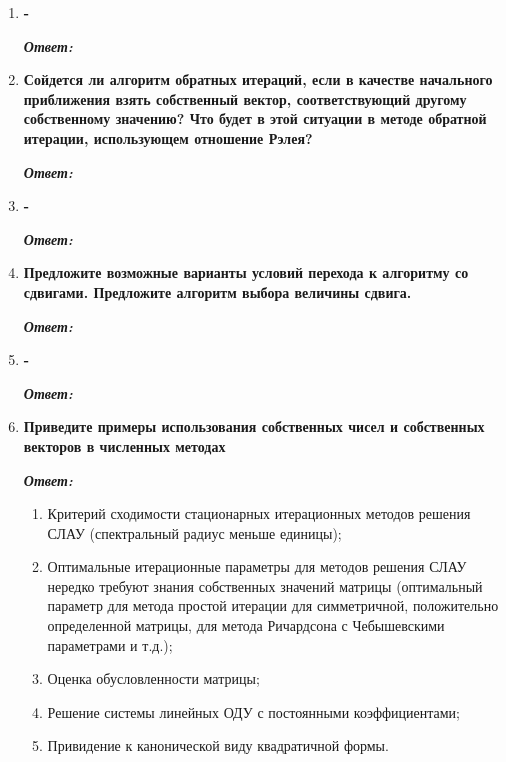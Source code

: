 \documentclass[12pt, a4paper]{article}
\begin{document}
\begin{enumerate}
	
	\item \textbf{-}
	\vspace*{0.2cm}
	
	\textit{\textbf{Ответ:}}
	
	\item \textbf{Сойдется ли алгоритм обратных итераций, если в качестве начального приближения взять собственный вектор, соответствующий другому собственному значению? Что будет в этой ситуации в методе обратной итерации, использующем отношение Рэлея?}
	
	\vspace*{0.2cm}
	
	\textit{\textbf{Ответ:}}
	
	
	\item \textbf{-}
	\vspace*{0.2cm}
	
	\textit{\textbf{Ответ:}}
	
	\item \textbf{ Предложите возможные варианты условий перехода к алгоритму со сдвигами. Предложите алгоритм выбора величины сдвига.}
	\vspace*{0.2cm}
	
	\textit{\textbf{Ответ:}}
	
	\item \textbf{-}
	\vspace*{0.2cm}
	
	\textit{\textbf{Ответ:}}
	
	\item \textbf{Приведите примеры использования собственных чисел и собственных векторов в численных методах}
	\vspace*{0.2cm}
	
	\textit{\textbf{Ответ:}}
	\begin{enumerate}
		\item Критерий сходимости стационарных итерационных методов решения СЛАУ (спектральный радиус меньше единицы); 
		\item Оптимальные итерационные параметры для методов решения СЛАУ нередко требуют знания собственных значений матрицы (оптимальный параметр для метода простой итерации для симметричной, положительно определенной матрицы, для метода Ричардсона с Чебышевскими параметрами и т.д.);
		\item Оценка обусловленности матрицы;
		\item Решение системы линейных ОДУ с постоянными коэффициентами; 
		\item Привидение к канонической виду квадратичной формы. 
	\end{enumerate}
	
	\end{enumerate}
\end{document}
